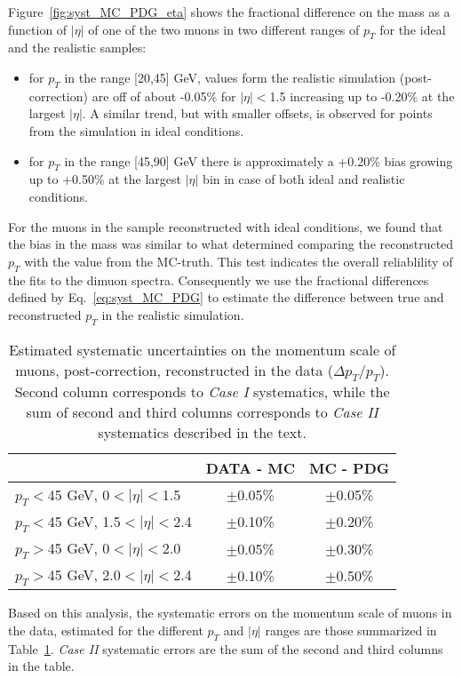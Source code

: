 Figure~\ref{fig:syst_MC_PDG_eta} shows the fractional difference on
the mass as a function of $|\eta|$ of one of the two muons in two
different ranges of $p_T$ for the ideal and the realistic samples:
\begin{itemize}
\item for $p_T$ in the range [20,45] GeV, values
form the realistic simulation (post-correction) are off of about -0.05\%
for $|\eta|<$1.5 increasing up to -0.20\% at the largest $|\eta|$.
A similar trend, but with smaller offsets, is observed for points from the simulation in ideal
conditions. 
\item for $p_T$ in the range [45,90] GeV there is approximately
a +0.20\% bias growing up to +0.50\% at the largest $|\eta|$ bin
in case of both ideal and realistic conditions. 
\end{itemize}
For the muons in the sample reconstructed with ideal conditions, 
we found that the bias in the mass was similar to what determined
comparing the reconstructed $p_T$ with the value from the
MC-truth. This test indicates the overall reliablility of the fits
to the dimuon spectra. Consequently we use the fractional differences
defined by Eq.~\ref{eq:syst_MC_PDG} to estimate the difference between 
true and reconstructed $p_T$ in the realistic simulation.

\begin{table}[h]
\begin{center}
\caption{Estimated systematic uncertainties on the momentum scale
  of muons, post-correction, reconstructed in the data ($\Delta p_T/p_T$).
  Second column corresponds to {\sl Case I} systematics, while
  the sum of second and third columns corresponds to {\sl Case II}
  systematics described in the text.\label{tab:systematics}} 
\begin{tabular}{|l|c|c|}
\hline
 & DATA - MC & MC - PDG \\
\hline 
$p_T<$45 GeV,   0$<|\eta|<$1.5 & $\pm$0.05\%& $\pm$0.05\% \\
$p_T<$45 GeV, 1.5$<|\eta|<$2.4 & $\pm$0.10\%& $\pm$0.20\% \\
$p_T>$45 GeV,   0$<|\eta|<$2.0 & $\pm$0.05\%& $\pm$0.30\% \\
$p_T>$45 GeV, 2.0$<|\eta|<$2.4 & $\pm$0.10\%& $\pm$0.50\% \\
\hline
\hline
\end{tabular}
\end{center}
\end{table}


Based on this analysis, the systematic errors on the momentum scale of
muons in the data, estimated for the
different $p_T$ and $|\eta|$ ranges are those summarized in
Table~\ref{tab:systematics}. {\sl Case II} systematic errors are the sum of the
second and third columns in the table.
